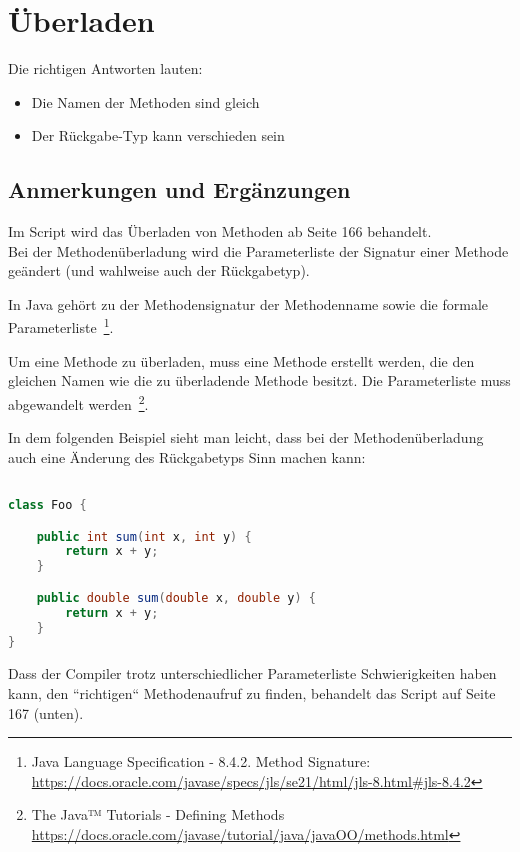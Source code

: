 \chapter{Überladen}

Die richtigen Antworten lauten:

\begin{itemize}
    \item Die Namen der Methoden sind gleich
    \item Der Rückgabe-Typ kann verschieden sein
\end{itemize}


\section*{Anmerkungen und Ergänzungen}

Im Script wird das Überladen von Methoden ab Seite 166 behandelt.\\


Bei der Methodenüberladung wird die Parameterliste der Signatur einer Methode geändert (und wahlweise auch der Rückgabetyp).

In Java gehört zu der Methodensignatur der Methodenname sowie die formale Parameterliste~\footnote {
    Java Language Specification - 8.4.2. Method Signature: \url{https://docs.oracle.com/javase/specs/jls/se21/html/jls-8.html#jls-8.4.2}
}.

Um eine Methode zu überladen, muss eine Methode erstellt werden, die den gleichen Namen wie die zu überladende Methode besitzt.
Die Parameterliste muss abgewandelt werden~\footnote{The Java™ Tutorials - Defining Methods \url{https://docs.oracle.com/javase/tutorial/java/javaOO/methods.html}}.

In dem folgenden Beispiel sieht man leicht, dass bei der Methodenüberladung auch eine Änderung des Rückgabetyps Sinn machen kann:

\begin{lstlisting}[language=java]

class Foo {

    public int sum(int x, int y) {
        return x + y;
    }

    public double sum(double x, double y) {
        return x + y;
    }
}

\end{lstlisting}

Dass der Compiler trotz unterschiedlicher Parameterliste Schwierigkeiten haben kann, den ``richtigen`` Methodenaufruf zu finden,
behandelt das Script auf Seite 167 (unten).\\

